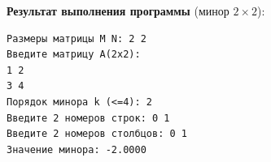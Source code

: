 \textbf{Результат выполнения программы} (минор $2{\times}2$):
\begin{lstlisting}[language={},basicstyle=\ttfamily\small,frame=single]
Размеры матрицы M N: 2 2
Введите матрицу A(2x2):
1 2
3 4
Порядок минора k (<=4): 2
Введите 2 номеров строк: 0 1
Введите 2 номеров столбцов: 0 1
Значение минора: -2.0000
\end{lstlisting}

